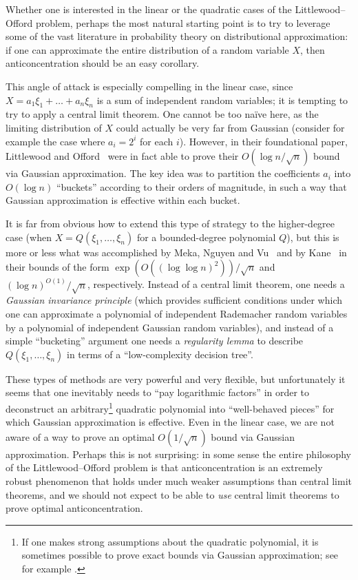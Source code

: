 \documentclass[english]{article}
\theoremstyle{remark}
\numberwithin{equation}{section}
\numberwithin{figure}{section}
\begin{document}
Whether one is interested in the linear or the quadratic cases of the Littlewood--Offord problem, perhaps the most natural starting point is to try to leverage some of the vast literature
in probability theory on distributional approximation: if one can approximate the entire distribution of
a random variable $X$, then anticoncentration should be an easy corollary.

This angle of attack is especially compelling in the linear case, since $X=a_{1}\xi_{1}+\dots+a_{n}\xi_{n}$ is a sum of independent random variables; it is tempting to try to apply a central limit theorem. One cannot be too na\"ive here, as the limiting distribution of $X$ could actually be very far from Gaussian (consider for example the case where $a_{i}=2^{i}$ for each $i$). However, in their foundational paper, Littlewood and Offord~\cite{LO43}
were in fact able to prove their $O(\log n/\sqrt{n})$ bound via Gaussian
approximation. The key idea was to partition the coefficients $a_{i}$
into $O(\log n)$ ``buckets'' according to their orders of
magnitude, in such a way that Gaussian approximation is effective
within each bucket.

It is far from obvious how to extend this type of strategy to the
higher-degree case (when $X=Q(\xi_{1},\dots,\xi_{n})$ for a
bounded-degree polynomial $Q$), but this is more or less what was
accomplished by Meka, Nguyen and Vu~\cite{MNV16} and by Kane~\cite{Kan14}
in their bounds of the form $\exp(O((\log\log n)^{2}))/\sqrt{n}$
and $(\log n)^{O(1)}/\sqrt{n}$, respectively. Instead of a central
limit theorem, one needs a \emph{Gaussian invariance principle} (which
provides sufficient conditions under which one can approximate a polynomial
of independent Rademacher random variables by a polynomial of independent
Gaussian random variables), and instead of a simple ``bucketing''
argument one needs a \emph{regularity lemma} to describe $Q(\xi_{1},\dots,\xi_{n})$
in terms of a ``low-complexity decision tree''.

These types of methods are very powerful and very flexible, but unfortunately
it seems that one inevitably needs to ``pay logarithmic factors''
in order to deconstruct an arbitrary\footnote{If one makes strong assumptions about the quadratic polynomial, it
is sometimes possible to prove exact bounds via Gaussian approximation;
see for example \cite{KSSS23}.} quadratic polynomial into ``well-behaved pieces'' for which Gaussian
approximation is effective. Even in the linear case, we are not aware of a way to prove an optimal $O(1/\sqrt n)$ bound via Gaussian approximation. Perhaps this is not surprising: in some sense the entire philosophy of the Littlewood--Offord problem is that anticoncentration is an extremely robust phenomenon that holds under much weaker assumptions than central limit theorems, and we should not expect to be able to \emph{use} central limit theorems to prove optimal anticoncentration.
\end{document}
